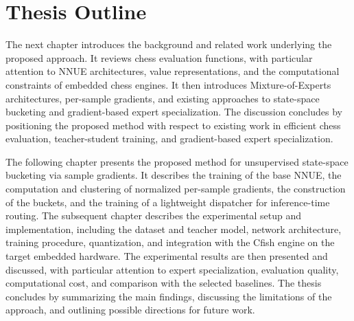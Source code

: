 \section{Thesis Outline}

The next chapter introduces the background and related work underlying the proposed approach. It reviews chess evaluation functions, with particular attention to NNUE architectures, value representations, and the computational constraints of embedded chess engines. It then introduces Mixture-of-Experts architectures, per-sample gradients, and existing approaches to state-space bucketing and gradient-based expert specialization. The discussion concludes by positioning the proposed method with respect to existing work in efficient chess evaluation, teacher-student training, and gradient-based expert specialization.

The following chapter presents the proposed method for unsupervised state-space bucketing via sample gradients. It describes the training of the base NNUE, the computation and clustering of normalized per-sample gradients, the construction of the buckets, and the training of a lightweight dispatcher for inference-time routing. The subsequent chapter describes the experimental setup and implementation, including the dataset and teacher model, network architecture, training procedure, quantization, and integration with the Cfish engine on the target embedded hardware. The experimental results are then presented and discussed, with particular attention to expert specialization, evaluation quality, computational cost, and comparison with the selected baselines. The thesis concludes by summarizing the main findings, discussing the limitations of the approach, and outlining possible directions for future work.





